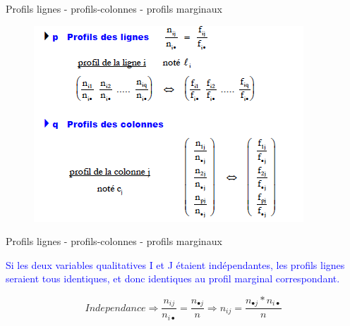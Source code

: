 \documentclass[11pt]{beamer}
\begin{document}
\begin{frame}{Profils lignes - profils-colonnes - profils
marginaux}
\begin{figure}
\includegraphics[scale=0.7]{exemple9.png}  
\end{figure}
\end{frame}



%
%


\begin{frame}{Profils lignes - profils-colonnes - profils
marginaux}

\textcolor{blue}{Si les deux variables qualitatives I et J étaient indépendantes, les profils lignes seraient tous identiques, et donc identiques au profil marginal
correspondant.}

$$Independance \Rightarrow \frac{n_{ij}}{n_{i \bullet}}=\frac{n_{\bullet j}}{n} \Rightarrow n_{ij}=\frac{n_{\bullet j}*n_{i \bullet}}{n}$$

\end{frame}
\end{document}
